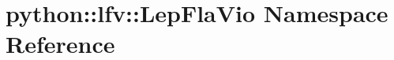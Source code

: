 \hypertarget{namespacepython_1_1lfv_1_1LepFlaVio}{
\section{python::lfv::LepFlaVio Namespace Reference}
\label{namespacepython_1_1lfv_1_1LepFlaVio}
}
